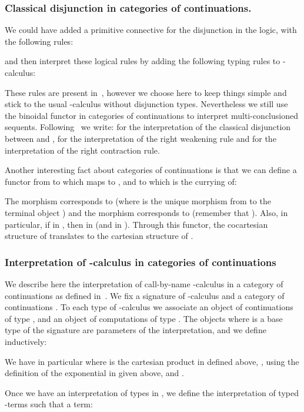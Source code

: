 \documentclass{CSML}
\begin{document}
\subsubsection{Classical disjunction in categories of continuations.} We could have added a primitive connective  for the disjunction in the logic, with the following rules:

and then interpret these logical rules by adding the following typing rules to -calculus:

These rules are present in~\cite{SelingerControl}, however we choose here to keep things simple and stick to the usual -calculus without disjunction types. Nevertheless we still use the binoidal functor  in categories of continuations to interpret multi-conclusioned sequents. Following~\cite{SelingerControl} we write:  for the interpretation of the classical disjunction between  and ,  for the interpretation of the right weakening rule and  for the interpretation of the right contraction rule.\par
Another interesting fact about categories of continuations is that we can define a functor from  to  which maps  to , and  to  which is the currying of:

The morphism  corresponds to  (where  is the unique morphism from  to the terminal object ) and the morphism  corresponds to  (remember that ). Also, in particular, if  in , then  in  (and in ). Through this functor, the cocartesian structure of  translates to the cartesian structure of .
\subsubsection{Interpretation of \texorpdfstring{}{lambda-mu}-calculus in categories of continuations}
\label{CatInterp}
We describe here the interpretation of call-by-name -calculus in a category of continuations as defined in~\cite{SelingerControl}. We fix a signature of -calculus and a category of continuations . To each type  of -calculus we associate an object  of continuations of type , and an object  of computations of type . The objects  where  is a base type of the signature are parameters of the interpretation, and we define inductively:

We have in particular  where  is the cartesian product in  defined above, , using the definition of the exponential in  given above, and .\par
Once we have an interpretation of types in , we define the interpretation of typed -terms such that a term:
\end{document}
